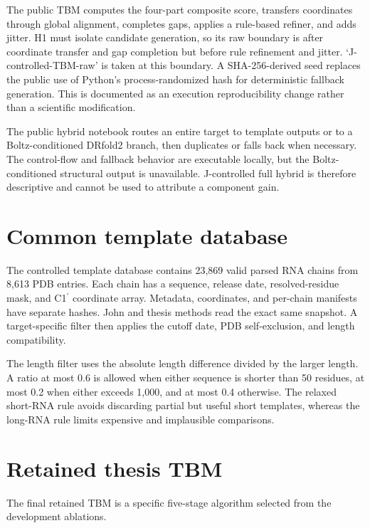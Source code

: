 \documentclass[12pt,a4paper,oneside]{report}
\newcommand{\cprime}{C1$^{\prime}$}
\begin{document}
The public TBM computes the four-part composite score, transfers coordinates through
global alignment, completes gaps, applies a rule-based refiner, and adds jitter. H1
must isolate candidate generation, so its raw boundary is after coordinate transfer
and gap completion but before rule refinement and jitter. `J-controlled-TBM-raw' is
taken at this boundary. A SHA-256-derived seed replaces the public use of Python's
process-randomized hash for deterministic fallback generation. This is documented as
an execution reproducibility change rather than a scientific modification.

The public hybrid notebook routes an entire target to template outputs or to a
Boltz-conditioned DRfold2 branch, then duplicates or falls back when necessary. The
control-flow and fallback behavior are executable locally, but the Boltz-conditioned
structural output is unavailable. J-controlled full hybrid is therefore descriptive
and cannot be used to attribute a component gain.

\section{Common template database}

The controlled template database contains 23,869 valid parsed RNA chains from 8,613
PDB entries. Each chain has a sequence, release date, resolved-residue mask, and
\cprime{} coordinate array. Metadata, coordinates, and per-chain manifests have
separate hashes. John and thesis methods read the exact same snapshot. A target-specific
filter then applies the cutoff date, PDB self-exclusion, and length compatibility.

The length filter uses the absolute length difference divided by the larger length. A
ratio at most 0.6 is allowed when either sequence is shorter than 50 residues, at most
0.2 when either exceeds 1,000, and at most 0.4 otherwise. The relaxed short-RNA rule
avoids discarding partial but useful short templates, whereas the long-RNA rule limits
expensive and implausible comparisons.

\section{Retained thesis TBM}

The final retained TBM is a specific five-stage algorithm selected from the development
ablations.
\end{document}
